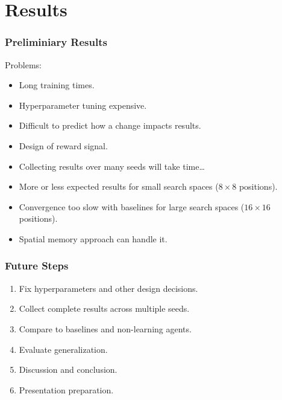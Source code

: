 \section{Results}

\begin{frame}
    \frametitle{Preliminiary Results}

    Problems:

    \begin{itemize}
        \item Long training times.
        \item Hyperparameter tuning expensive.
        \item Difficult to predict how a change impacts results.
        \item Design of reward signal.
        \item Collecting results over many seeds will take time\dots
        \item More or less expected results for small search spaces (\(8 \times 8\) positions).
        \item Convergence too slow with baselines for large search spaces (\(16 \times 16\) positions).
        \item Spatial memory approach can handle it.
    \end{itemize}
\end{frame}

\begin{frame}
    \frametitle{Future Steps}

    \begin{enumerate}
        \item Fix hyperparameters and other design decisions.
        \item Collect complete results across multiple seeds.
        \item Compare to baselines and non-learning agents.
        \item Evaluate generalization.
        \item Discussion and conclusion.
        \item Presentation preparation.
    \end{enumerate}
\end{frame}
